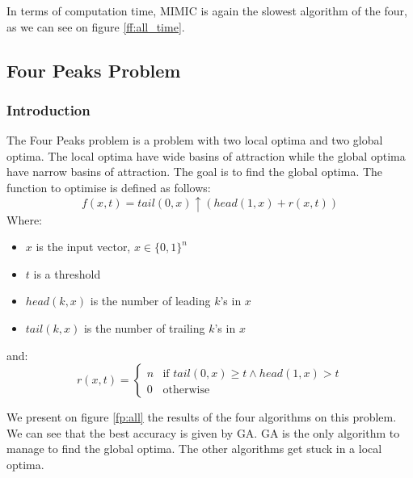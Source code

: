 \documentclass[twocolumn, 10pt]{article}
\begin{document}
				In terms of computation time, MIMIC is again the slowest algorithm of the four, as we can see on figure \ref{ff:all_time}.
		\subsection{Four Peaks Problem}
			\subsubsection*{Introduction}
				The Four Peaks problem is a problem with two local optima and two global optima. The local optima have wide basins of attraction while the global optima have narrow basins of attraction. The goal is to find the global optima. The function to optimise is defined as follows:
				\begin{equation}
					f(x, t) = tail(0, x) \uparrow (head(1, x) + r(x, t))
				\end{equation}
				Where:
				\begin{itemize}
					\item $x$ is the input vector, $x \in \{0, 1\}^n$
					\item $t$ is a threshold
					\item $head(k, x)$ is the number of leading $k$'s in $x$
					\item $tail(k, x)$ is the number of trailing $k$'s in $x$
				\end{itemize}
				and:
				\begin{equation}
					r(x, t) = \begin{cases}
						n & \text{if } tail(0, x) \geq t \land head(1, x) > t \\
						0 & \text{otherwise}
					\end{cases}
				\end{equation}

				We present on figure \ref{fp:all} the results of the four algorithms on this problem. We can see that the best accuracy is given by GA. GA is the only algorithm to manage to find the global optima. The other algorithms get stuck in a local optima.
\end{document}

